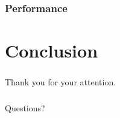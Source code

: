 \documentclass[18pt, xcolor=table]{beamer}
\begin{document}
\begin{frame}[t]
  \frametitle{Performance}
  
\end{frame}

\section{Conclusion}

\begin{frame}
  \frametitle{}
  \begin{center}
    \huge{Thank you for your attention.}
  \end{center}
\end{frame}

\begin{frame}
  \frametitle{}
  \begin{center}
    \huge{Questions?}
  \end{center}
\end{frame}
\end{document}
